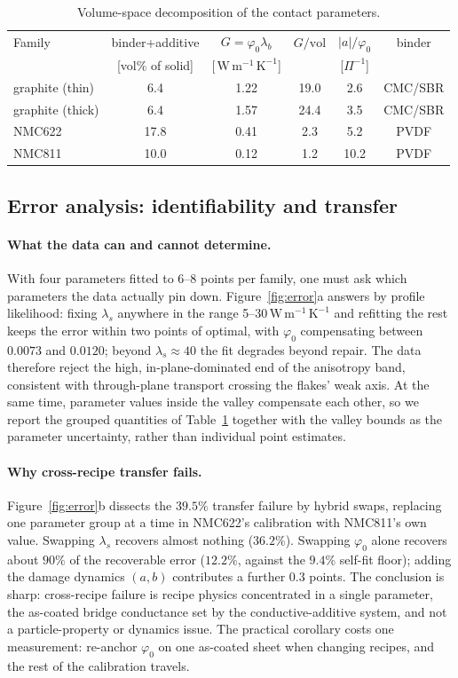 \documentclass[10pt,a4paper]{article}
\newcommand{\lams}{\lambda_{s}}
\newcommand{\lamb}{\lambda_{b}}
\newcommand{\WmK}{\,\mathrm{W\,m^{-1}\,K^{-1}}}
\begin{document}
\begin{table}[tb]\centering\small
\caption{Volume-space decomposition of the contact parameters.}
\label{tab:design}
\begin{tabular}{lccccc}
\toprule
Family & binder+additive & $G=\varphi_0\lamb$ & $G/\mathrm{vol}$ & $|a|/\varphi_0$ & binder\\
 & [vol\% of solid] & [$\WmK$] & & [$\Pi^{-1}$] & \\
\midrule
graphite (thin)  & 6.4  & 1.22 & 19.0 & 2.6  & CMC/SBR\\
graphite (thick) & 6.4  & 1.57 & 24.4 & 3.5  & CMC/SBR\\
NMC622           & 17.8 & 0.41 & 2.3  & 5.2  & PVDF\\
NMC811           & 10.0 & 0.12 & 1.2  & 10.2 & PVDF\\
\bottomrule
\end{tabular}
\end{table}

\subsection{Error analysis: identifiability and transfer}
\label{sec:results:errors}

\paragraph{What the data can and cannot determine.}
With four parameters fitted to 6--8 points per family, one must ask which parameters the data actually pin down. Figure~\ref{fig:error}a answers by profile likelihood: fixing $\lams$ anywhere in the range 5--30$\WmK$ and refitting the rest keeps the error within two points of optimal, with $\varphi_0$ compensating between $0.0073$ and $0.0120$; beyond $\lams\approx40$ the fit degrades beyond repair. The data therefore reject the high, in-plane-dominated end of the anisotropy band, consistent with through-plane transport crossing the flakes' weak axis. At the same time, parameter values inside the valley compensate each other, so we report the grouped quantities of Table~\ref{tab:design} together with the valley bounds as the parameter uncertainty, rather than individual point estimates.

\paragraph{Why cross-recipe transfer fails.}
Figure~\ref{fig:error}b dissects the $39.5\%$ transfer failure by hybrid swaps, replacing one parameter group at a time in NMC622's calibration with NMC811's own value. Swapping $\lams$ recovers almost nothing ($36.2\%$). Swapping $\varphi_0$ alone recovers about $90\%$ of the recoverable error ($12.2\%$, against the $9.4\%$ self-fit floor); adding the damage dynamics $(a,b)$ contributes a further $0.3$ points. The conclusion is sharp: cross-recipe failure is recipe physics concentrated in a single parameter, the as-coated bridge conductance set by the conductive-additive system, and not a particle-property or dynamics issue. The practical corollary costs one measurement: re-anchor $\varphi_0$ on one as-coated sheet when changing recipes, and the rest of the calibration travels.
\end{document}
